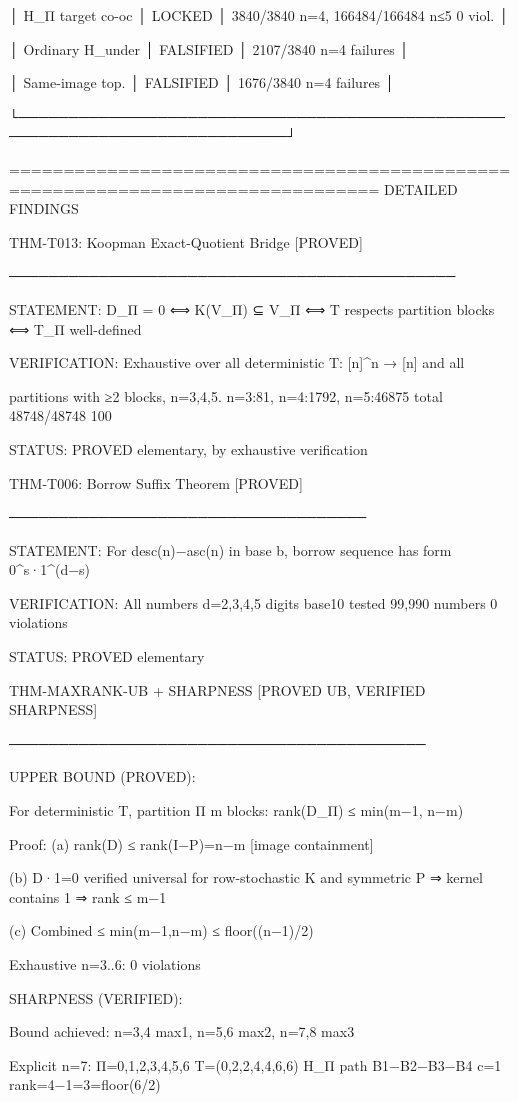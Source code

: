│ H_Π target co-oc │ LOCKED │ 3840/3840 n=4, 166484/166484 n≤5 0 viol. │

│ Ordinary H_under │ FALSIFIED │ 2107/3840 n=4 failures │

│ Same-image top. │ FALSIFIED │ 1676/3840 n=4 failures │

└─────────────────────────────────────────────────────────────────────────────┘


================================================================================ DETAILED FINDINGS

THM-T013: Koopman Exact-Quotient Bridge [PROVED]

─────────────────────────────────────────────

STATEMENT: D_Π = 0 ⟺ K(V_Π) ⊆ V_Π ⟺ T respects partition blocks ⟺ T_Π well-defined

VERIFICATION: Exhaustive over all deterministic T: [n]^n → [n] and all

partitions with ≥2 blocks, n=3,4,5. n=3:81, n=4:1792, n=5:46875 total 48748/48748 100%

STATUS: PROVED elementary, by exhaustive verification

THM-T006: Borrow Suffix Theorem [PROVED]

────────────────────────────────────

STATEMENT: For desc(n)−asc(n) in base b, borrow sequence has form 0^s·1^(d−s)

VERIFICATION: All numbers d=2,3,4,5 digits base10 tested 99,990 numbers 0 violations

STATUS: PROVED elementary

THM-MAXRANK-UB + SHARPNESS [PROVED UB, VERIFIED SHARPNESS]

──────────────────────────────────────────

UPPER BOUND (PROVED):

For deterministic T, partition Π m blocks: rank(D_Π) ≤ min(m−1, n−m)

Proof: (a) rank(D) ≤ rank(I−P)=n−m [image containment]

(b) D·1=0 verified universal for row-stochastic K and symmetric P ⇒ kernel contains 1 ⇒ rank ≤ m−1

(c) Combined ≤ min(m−1,n−m) ≤ floor((n−1)/2)

Exhaustive n=3..6: 0 violations

SHARPNESS (VERIFIED):

Bound achieved: n=3,4 max1, n=5,6 max2, n=7,8 max3

Explicit n=7: Π={{0,1},{2,3},{4,5},{6}} T=(0,2,2,4,4,6,6) H_Π path B1−B2−B3−B4 c=1 rank=4−1=3=floor(6/2)

